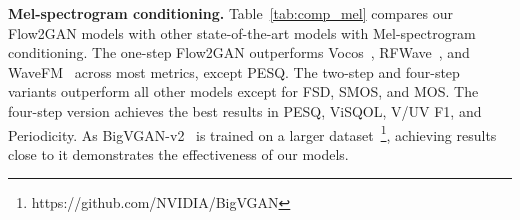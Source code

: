 \documentclass{article} %
\begin{document}
\noindent\textbf{Mel-spectrogram conditioning.} Table~\ref{tab:comp_mel} compares our Flow2GAN models with other state-of-the-art models with Mel-spectrogram conditioning. 
The one-step Flow2GAN outperforms Vocos~\citep{vocos}, RFWave~\citep{rfwave}, and WaveFM~\citep{wavefm} across most metrics, except PESQ. The two-step and four-step variants outperform all other models except for FSD, SMOS, and MOS. The four-step version achieves the best results in PESQ, ViSQOL, V/UV F1, and Periodicity.
As BigVGAN-v2~\citep{bigvgan} is trained on a larger dataset~\footnote{https://github.com/NVIDIA/BigVGAN}, achieving results close to it demonstrates the effectiveness of our models.
\end{document}

